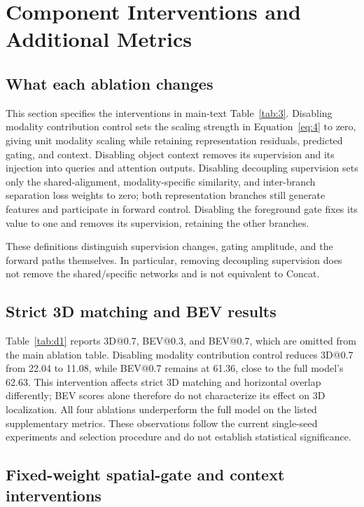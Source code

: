 \section{Component Interventions and Additional Metrics}
\label{app:d}

\subsection{What each ablation changes}
\label{subsec:d1}

This section specifies the interventions in main-text Table~\ref{tab:3}. Disabling modality contribution control sets the scaling strength in Equation~\eqref{eq:4} to zero, giving unit modality scaling while retaining representation residuals, predicted gating, and context. Disabling object context removes its supervision and its injection into queries and attention outputs. Disabling decoupling supervision sets only the shared-alignment, modality-specific similarity, and inter-branch separation loss weights to zero; both representation branches still generate features and participate in forward control. Disabling the foreground gate fixes its value to one and removes its supervision, retaining the other branches.

These definitions distinguish supervision changes, gating amplitude, and the forward paths themselves. In particular, removing decoupling supervision does not remove the shared/specific networks and is not equivalent to Concat.

\subsection{Strict 3D matching and BEV results}
\label{subsec:d2}

Table~\ref{tab:d1} reports 3D@0.7, BEV@0.3, and BEV@0.7, which are omitted from the main ablation table. Disabling modality contribution control reduces 3D@0.7 from 22.04 to 11.08, while BEV@0.7 remains at 61.36, close to the full model's 62.63. This intervention affects strict 3D matching and horizontal overlap differently; BEV scores alone therefore do not characterize its effect on 3D localization. All four ablations underperform the full model on the listed supplementary metrics. These observations follow the current single-seed experiments and selection procedure and do not establish statistical significance.




\subsection{Fixed-weight spatial-gate and context interventions}
\label{subsec:d3}

